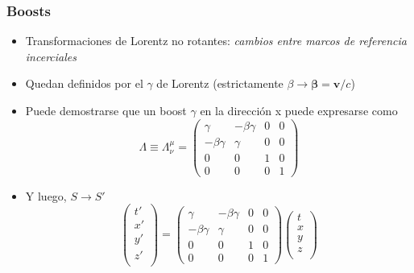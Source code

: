 \documentclass[xetex,mathserif,serif,10pt]{beamer}
\begin{document}
\begin{frame}
  \frametitle{Boosts}
  \begin{itemize}
    \item Transformaciones de Lorentz no rotantes: {\emph{cambios entre marcos de referencia incerciales}}
    \item Quedan definidos por el $\gamma$ de Lorentz (estrictamente $\beta \to \mathbf{\beta}=\mathbf{v}/c$)
    \item Puede demostrarse que un boost $\gamma$ en la dirección x puede expresarse como
    \begin{equation}
      \Lambda \equiv\Lambda_\nu^\mu = \left ( 
        \begin{array}{cccc}
          \gamma & -\beta\gamma & 0 & 0 \\
          -\beta\gamma & \gamma & 0 & 0 \\
          0 & 0 & 1 & 0 \\
          0 & 0 & 0 & 1
        \end{array}
      \right )
    \end{equation}
    \item Y luego, $S \to S'$
    \begin{equation}\label{EQboost}
      \left (
        \begin{array}{c}
          t' \\
          x' \\
          y' \\
          z' \\
        \end{array}
      \right ) 
      = 
      \left (
        \begin{array}{cccc}
          \gamma & -\beta\gamma & 0 & 0 \\
          -\beta\gamma & \gamma & 0 & 0 \\
          0 & 0 & 1 & 0 \\
          0 & 0 & 0 & 1
        \end{array}
      \right )
      \left (
        \begin{array}{c}
          t \\
          x \\
          y \\
          z \\
        \end{array}
      \right ) 
    \end{equation}
  \end{itemize}
\end{frame}
\end{document}
